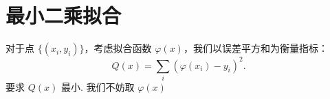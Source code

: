 \chapter{最小二乘拟合}
对于点 $\{(x_i,y_i)\}$，考虑拟合函数 $\varphi(x)$，我们以误差平方和为衡量指标：
\[
    Q(x) = \sum_i (\varphi(x_i)-y_i)^2.
\]
要求 $Q(x)$ 最小. 我们不妨取 $\varphi(x)$ 